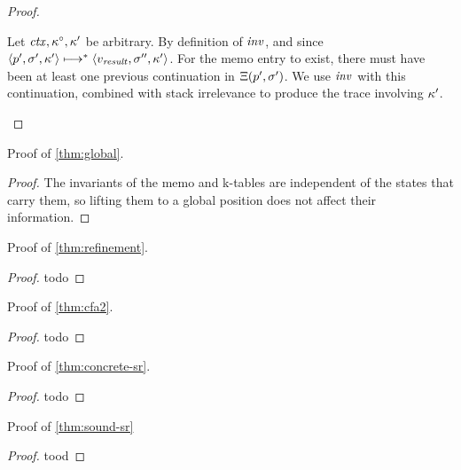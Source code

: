 \begin{proof}
\begin{byCases}
{    Let $\mathit{ctx}, \kappa^\circ, \kappa'$ be arbitrary.
    By definition of $\mathit{inv}$, and since $\langle p',\sigma',\kappa' \rangle \longmapsto^* \langle v_{\mathit{result}}, \sigma'', \kappa' \rangle$.
    For the memo entry to exist, there must have been at least one previous continuation in $\Xi(p',\sigma')$.
    We use $\mathit{inv}$ with this continuation, combined with stack irrelevance to produce the trace involving $\kappa'$.
    }
  \end{byCases}
\end{proof}

\noindent{}Proof of \autoref{thm:global}.
\begin{proof}
  The invariants of the memo and k-tables are independent of the states that carry them, so lifting them to a global position does not affect their information.
\end{proof}

\noindent{}Proof of \autoref{thm:refinement}.
\begin{proof}
  todo
\end{proof}

\noindent{}Proof of \autoref{thm:cfa2}.
\begin{proof}
  todo
\end{proof}

\noindent{}Proof of \autoref{thm:concrete-sr}.
\begin{proof}
  todo
\end{proof}

\noindent{}Proof of \autoref{thm:sound-sr}
\begin{proof}
  tood
\end{proof}